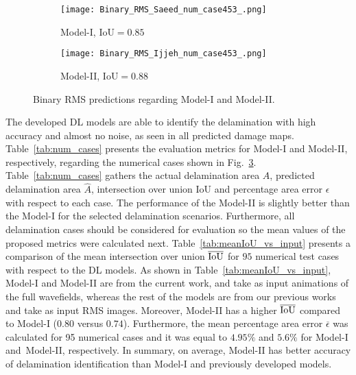 \begin{sloppypar}
\begin{figure}[ht!]
\begin{subfigure}[b]{0.32\textwidth}
			\centering
			\texttt{[image: Binary\_RMS\_Saeed\_num\_case453\_.png]}
			\caption{Model-I, IoU\(=0.85\)}
			\label{fig:Convlstm_binary_RMS_453}
		\end{subfigure}
		\hfill
		\begin{subfigure}[b]{0.32\textwidth}
			\centering
			\texttt{[image: Binary\_RMS\_Ijjeh\_num\_case453\_.png]}
			\caption{Model-II, IoU\(=0.88\)}
			\label{fig:AE_binary_RMS_453}
		\end{subfigure}
		\caption{Binary RMS predictions regarding Model-I and Model-II.}
		\label{fig:RMS_num_cases}
	\end{figure}
	
	The developed DL models are able to identify the delamination with high accuracy and almost no noise, as seen in all predicted damage maps.
	Table~\ref{tab:num_cases} presents the evaluation metrics for Model-I and Model-II, respectively, regarding the numerical cases shown in Fig.~\ref{fig:RMS_num_cases}.
	Table~\ref{tab:num_cases} gathers the actual delamination area \(A\), predicted delamination area \(\hat{A}\), intersection over union IoU and percentage area error \(\epsilon\) with respect to each case. 
	The performance of the Model-II is slightly better than the Model-I for the selected delamination scenarios.
	Furthermore, all delamination cases should be considered for evaluation so the mean values of the proposed metrics were calculated next.
	Table~\ref{tab:meanIoU_vs_input} presents a comparison of the mean intersection over union \(\overline{\textup{IoU}}\) for \(95\) numerical test cases with respect to the DL models.
	As shown in Table~\ref{tab:meanIoU_vs_input}, Model-I and Model-II are from the current work, and take as input animations of the full wavefields, whereas the rest of the models are from our previous works~\cite{Ijjeh2021, Ijjeh2022} and take as input RMS images.
	Moreover, Model-II has a higher \(\overline{\textup{IoU}}\) compared to Model-I (\(0.80\) versus \(0.74\)).
	Furthermore, the mean percentage area error \(\overline{\epsilon}\) was calculated for 95 numerical cases and it was equal to \(4.95 \%\) and \(5.6\%\) for Model-I and~Model-II, respectively.
	In summary, on average, Model-II has better accuracy of delamination identification than Model-I and previously developed models.
	\begin{table}[ht!]

\end{table}
\end{sloppypar}

